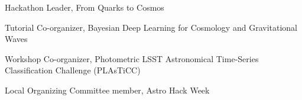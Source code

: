 \documentclass[11pt,letterpaper]{article}
\begin{document}
\nopagebreak\begin{list}{}{\malzlist}
	\item Hackathon Leader, From Quarks to Cosmos 
	\item Tutorial Co-organizer, Bayesian Deep Learning for Cosmology and Gravitational Waves 
	\item Workshop Co-organizer, Photometric LSST Astronomical Time-Series Classification Challenge (PLAsTiCC) 
	\item Local Organizing Committee member, Astro Hack Week 
\end{list}

%
%

%
\clearpage
\end{document}

